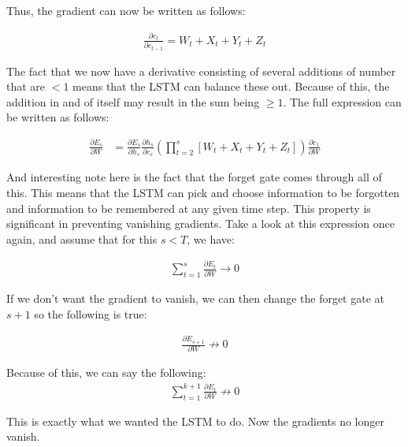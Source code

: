 \noindent
Thus, the gradient can now be written as follows:

\begin{align}
    \frac{\partial c_t}{\partial c_{t-1}} = W_t + X_t + Y_t + Z_t
\end{align}

\noindent
The fact that we now have a derivative consisting of several additions of number that are $<1$ means that the LSTM can balance these out. Because of this, the addition in and of itself may result in the sum being $\geq 1$. The full expression can be written as follows:


\begin{align}
    \frac{\partial E_s}{\partial W} &= \frac{\partial E_s}{\partial h_s}\frac{\partial h_s}{\partial c_s} \left(\prod_{t=2}^s \left[W_t + X_t + Y_t + Z_t \right] \right) \frac{\partial c_1} {\partial W}
\end{align}

\noindent
And interesting note here is the fact that the forget gate comes through all of this. This means that the LSTM can pick and choose information to be forgotten and information to be remembered at any given time step. This property is significant in preventing vanishing gradients. Take a look at this expression once again, and assume that for this $s < T$, we have:

\begin{align}
    \sum_{t=1}^s \frac{\partial E_t}{\partial W} \rightarrow 0
\end{align}

\noindent
If we don't want the gradient to vanish, we can then change the forget gate at $s+1$ so the following is true:

\begin{align}
    \frac{\partial E_{s+1}}{\partial W} \not \rightarrow 0
\end{align}

\noindent
Because of this, we can say the following:
\begin{align}
    \sum_{t=1}^{k+1} \frac{\partial E_t}{\partial W} \not \rightarrow 0
\end{align}

\noindent
This is exactly what we wanted the LSTM to do. Now the gradients no longer vanish.